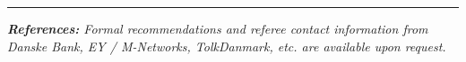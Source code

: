 \documentclass[9.5pt,a4paper]{article}
\begin{document}
\vspace{4pt}
{\color{boxborder}\rule{\linewidth}{0.5pt}}\vspace{2pt}
{\fontsize{7.5}{9.5}\selectfont\color{mutedgray}\textit{\textbf{References:} Formal recommendations and referee contact information from Danske Bank, EY / M-Networks, TolkDanmark, etc. are available upon request.}}
\end{document}
